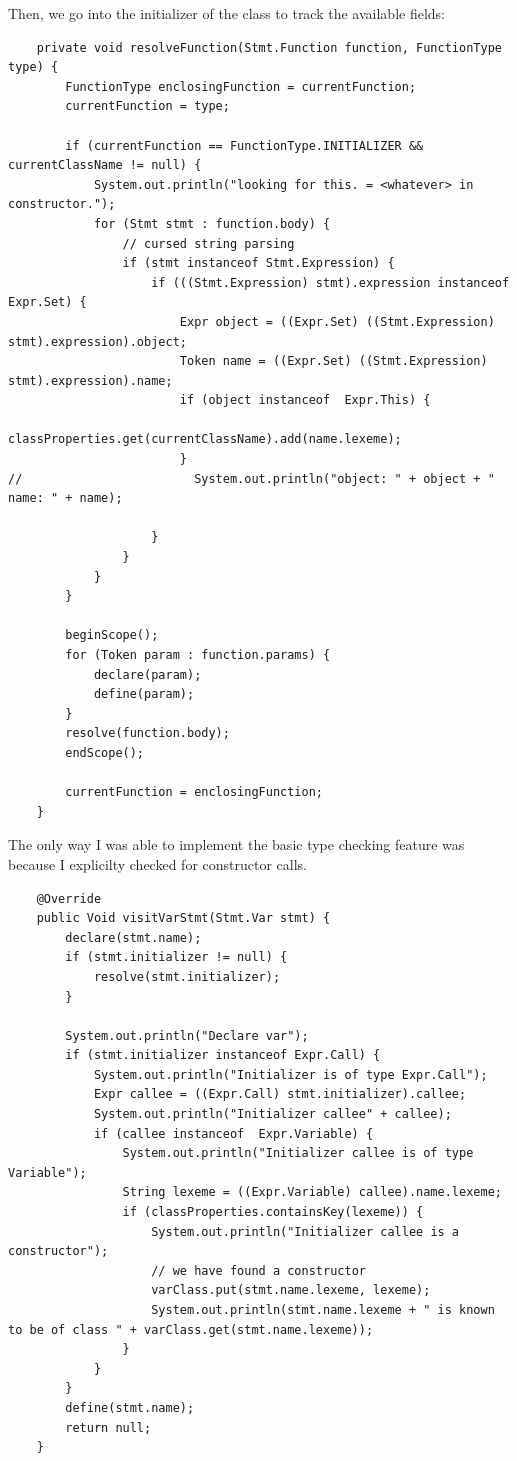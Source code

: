 \documentclass{article}
\begin{document}
\begin{enumerate}
{        Then, we go into the initializer of the class to track the available fields:
        \begin{verbatim}
    private void resolveFunction(Stmt.Function function, FunctionType type) {
        FunctionType enclosingFunction = currentFunction;
        currentFunction = type;

        if (currentFunction == FunctionType.INITIALIZER && currentClassName != null) {
            System.out.println("looking for this. = <whatever> in constructor.");
            for (Stmt stmt : function.body) {
                // cursed string parsing
                if (stmt instanceof Stmt.Expression) {
                    if (((Stmt.Expression) stmt).expression instanceof Expr.Set) {
                        Expr object = ((Expr.Set) ((Stmt.Expression) stmt).expression).object;
                        Token name = ((Expr.Set) ((Stmt.Expression) stmt).expression).name;
                        if (object instanceof  Expr.This) {
                            classProperties.get(currentClassName).add(name.lexeme);
                        }
//                        System.out.println("object: " + object + " name: " + name);

                    }
                }
            }
        }

        beginScope();
        for (Token param : function.params) {
            declare(param);
            define(param);
        }
        resolve(function.body);
        endScope();

        currentFunction = enclosingFunction;
    }

        \end{verbatim}
        
        The only way
        I was able to implement the basic type checking feature was because I 
        explicilty checked for constructor calls. 
        \begin{verbatim}
    @Override
    public Void visitVarStmt(Stmt.Var stmt) {
        declare(stmt.name);
        if (stmt.initializer != null) {
            resolve(stmt.initializer);
        }

        System.out.println("Declare var");
        if (stmt.initializer instanceof Expr.Call) {
            System.out.println("Initializer is of type Expr.Call");
            Expr callee = ((Expr.Call) stmt.initializer).callee;
            System.out.println("Initializer callee" + callee);
            if (callee instanceof  Expr.Variable) {
                System.out.println("Initializer callee is of type Variable");
                String lexeme = ((Expr.Variable) callee).name.lexeme;
                if (classProperties.containsKey(lexeme)) {
                    System.out.println("Initializer callee is a constructor");
                    // we have found a constructor
                    varClass.put(stmt.name.lexeme, lexeme);
                    System.out.println(stmt.name.lexeme + " is known to be of class " + varClass.get(stmt.name.lexeme));
                }
            }
        }
        define(stmt.name);
        return null;
    }
        \end{verbatim}

}
\end{enumerate}
\end{document}
